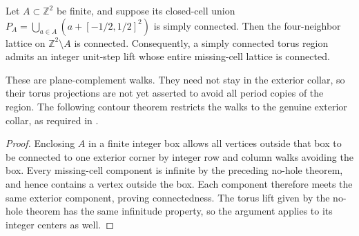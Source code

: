 \begin{lemma}%
    \label{thm:peps_integer_cell_exterior_connected}
    \leanok
    Let $A\subset\mathbb Z^2$ be finite, and suppose its closed-cell union
    $P_A=\bigcup_{a\in A}(a+[-1/2,1/2]^2)$ is simply connected. Then
    the four-neighbor lattice on $\mathbb Z^2\setminus A$ is connected.
    Consequently, a simply connected torus region admits an
    integer unit-step lift whose entire missing-cell lattice is connected.

    These are plane-complement walks. They need not stay in the
    exterior collar, so their torus projections are not yet asserted
    to avoid all period copies of the region. The following contour theorem restricts the walks to the genuine
    exterior collar, as required in
    \cite[proof of Theorem~6.9]{Schuch2010PEPS}.
\end{lemma}
\begin{proof}\leanok
    Enclosing $A$ in a finite integer box allows all vertices outside that box
    to be connected to one exterior corner by integer row and column
    walks avoiding the box. Every missing-cell component is infinite
    by the preceding no-hole theorem, and hence contains a vertex
    outside the box. Each component therefore meets the same exterior
    component, proving connectedness. The torus lift given
    by the no-hole theorem has the same infinitude property, so the
    argument applies to its integer centers as well.
\end{proof}



